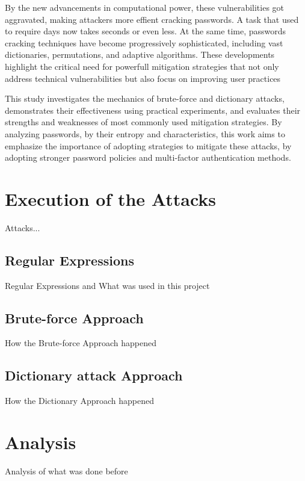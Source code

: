 \documentclass{comjnl}
\begin{document}
By the new advancements in computational power, these vulnerabilities got aggravated, making attackers more effient cracking passwords. A task that used to require days now takes seconds or even less. At the same time, passwords cracking techniques have become progressively sophisticated, including vast dictionaries, permutations, and adaptive algorithms. These developments highlight the critical need for powerfull mitigation strategies that not only address technical vulnerabilities but also focus on improving user practices 

This study investigates the mechanics of brute-force and dictionary attacks, demonstrates their effectiveness using practical experiments, and evaluates their strengths and weaknesses of most commonly used mitigation strategies. By analyzing passwords, by their entropy and characteristics, this work aims to emphasize the importance of adopting strategies to mitigate these attacks, by adopting stronger password policies and multi-factor authentication methods.

\section{Execution of the Attacks}

Attacks... 

\subsection{Regular Expressions}

Regular Expressions and What was used in this project

\subsection{Brute-force Approach}

How the Brute-force Approach happened

\subsection{Dictionary attack Approach}

How the Dictionary Approach happened

\section{Analysis}

Analysis of what was done before
\end{document}
